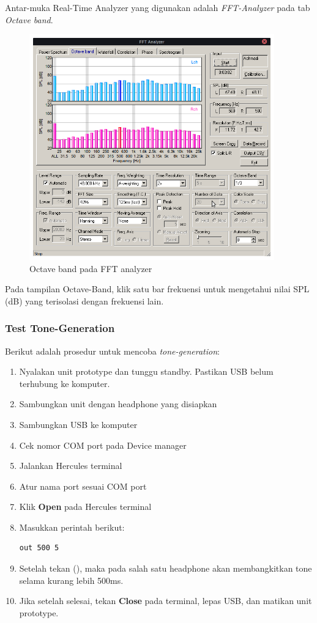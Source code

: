 \documentclass[12pt,]{article}
\begin{document}
	Antar-muka Real-Time Analyzer yang digunakan adalah \textit{FFT-Analyzer} pada tab \textit{Octave band}.
	
	\begin{figure}[!ht]
		\centering
		\includegraphics[width=300pt]{images/kemar/fft}
		\caption{Octave band pada FFT analyzer}
	\end{figure}

	Pada tampilan Octave-Band, klik satu bar frekuensi untuk mengetahui nilai SPL (dB)
	yang terisolasi dengan frekuensi lain.
	
	\newpage
	\subsubsection{Test Tone-Generation}
	Berikut adalah prosedur untuk mencoba \textit{tone-generation}:
	\begin{enumerate}
		\item Nyalakan unit prototype dan tunggu standby.
		Pastikan USB belum terhubung ke komputer.
		\item Sambungkan unit dengan headphone yang disiapkan
		\item Sambungkan USB ke komputer
		\item Cek nomor COM port pada Device manager
		\item Jalankan Hercules terminal
		\item Atur nama port sesuai COM port
		\item Klik \textbf{Open} pada Hercules terminal
		\item Masukkan perintah berikut:
		\begin{verbatim}
out 500 5
		\end{verbatim}
		\item Setelah tekan (\keys{\return}), maka pada salah satu headphone
		akan membangkitkan tone selama kurang lebih 500ms.
		\item Jika setelah selesai, tekan \textbf{Close} pada terminal,
		lepas USB, dan matikan unit prototype.

	\end{enumerate}
\end{document}
